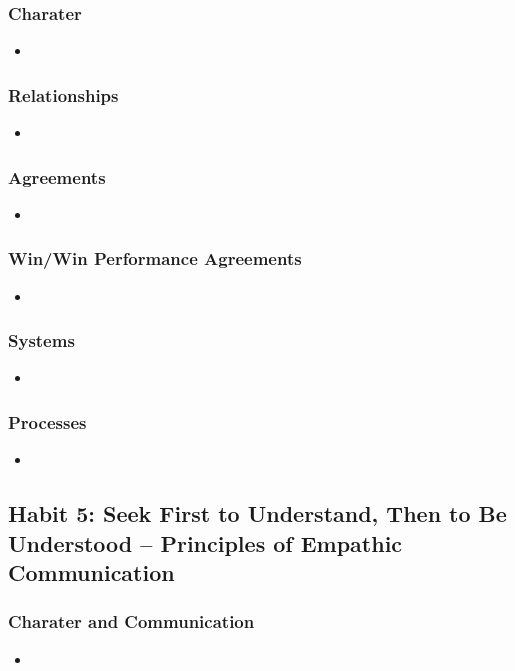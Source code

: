 \documentclass[11pt]{article}
\begin{document}
\subsubsection{Charater}
\begin{itemize}
\item 
\end{itemize}
\subsubsection{Relationships}
\begin{itemize}
\item 
\end{itemize}
\subsubsection{Agreements}
\begin{itemize}
\item 
\end{itemize}
\subsubsection{Win/Win Performance Agreements}
\begin{itemize}
\item 
\end{itemize}
\subsubsection{Systems}
\begin{itemize}
\item 
\end{itemize}
\subsubsection{Processes}
\begin{itemize}
\item 
\end{itemize}
\subsection{Habit 5: Seek First to Understand, Then to Be Understood -- Principles of Empathic Communication}
\subsubsection{Charater and Communication}
\begin{itemize}
\item 
\end{itemize}
\end{document}
